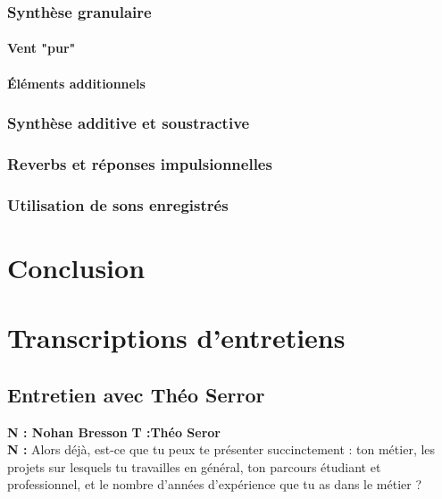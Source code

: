 ﻿\documentclass[12pt]{article}
\begin{document}
\subsubsection{Synthèse granulaire}

\paragraph{Vent "pur"}

\paragraph{Éléments additionnels}

\subsubsection{Synthèse additive et soustractive}

\subsubsection{Reverbs et réponses impulsionnelles}

\subsubsection{Utilisation de sons enregistrés}

\newpage

\section*{Conclusion}

\newpage

\printbibliography

\newpage

\appendix

\section{Transcriptions d'entretiens}
\subsection{Entretien avec Théo Serror}
\setlength{\parindent}{0pt}
\textbf{N : Nohan Bresson}
\textbf{T :Théo Seror}  
\\

\textbf{N :} Alors déjà, est-ce que tu peux te présenter succinctement : ton métier, les projets sur lesquels tu travailles en général, ton parcours étudiant et professionnel, et le nombre d'années d'expérience que tu as dans le métier ? 
\end{document}
